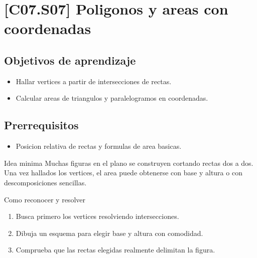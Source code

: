 \section{[C07.S07] Poligonos y areas con coordenadas}

\subsection*{Objetivos de aprendizaje}
\begin{itemize}
  \item Hallar vertices a partir de intersecciones de rectas.
  \item Calcular areas de triangulos y paralelogramos en coordenadas.
\end{itemize}

\subsection*{Prerrequisitos}
\begin{itemize}
  \item Posicion relativa de rectas y formulas de area basicas.
\end{itemize}

\begin{theorybox}{Idea minima}
Muchas figuras en el plano se construyen cortando rectas dos a dos. Una vez hallados los
vertices, el area puede obtenerse con base y altura o con descomposiciones sencillas.
\end{theorybox}

\begin{methodbox}{Como reconocer y resolver}
\begin{enumerate}
  \item Busca primero los vertices resolviendo intersecciones.
  \item Dibuja un esquema para elegir base y altura con comodidad.
  \item Comprueba que las rectas elegidas realmente delimitan la figura.
\end{enumerate}
\end{methodbox}

